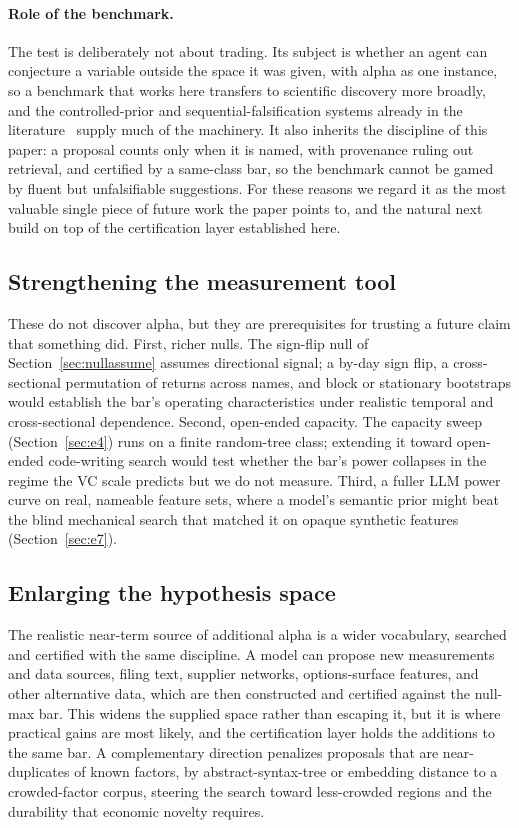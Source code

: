 \documentclass[11pt]{article}
\begin{document}
\paragraph{Role of the benchmark.} The test is deliberately not about trading. Its subject is
whether an agent can conjecture a variable outside the space it was given, with alpha as one instance, so
a benchmark that works here transfers to scientific discovery more broadly, and the controlled-prior and
sequential-falsification systems already in the literature~\cite{physgym,falsify} supply much of the
machinery. It also inherits the discipline of this paper: a proposal counts only when it is named, with
provenance ruling out retrieval, and certified by a same-class bar, so the benchmark cannot be gamed by
fluent but unfalsifiable suggestions. For these reasons we regard it as the most valuable single piece of
future work the paper points to, and the natural next build on top of the certification layer established
here.

\subsection{Strengthening the measurement tool}
\label{sec:future}

These do not discover alpha, but they are prerequisites for trusting a future claim that something
did. First, richer nulls. The sign-flip null of Section~\ref{sec:nullassume} assumes directional
signal; a by-day sign flip, a cross-sectional permutation of returns across names, and block or
stationary bootstraps would establish the bar's operating characteristics under realistic temporal and
cross-sectional dependence. Second, open-ended capacity. The capacity sweep (Section~\ref{sec:e4}) runs
on a finite random-tree class; extending it toward open-ended code-writing search would test whether
the bar's power collapses in the regime the VC scale predicts but we do not measure. Third, a fuller
LLM power curve on real, nameable feature sets, where a model's semantic prior might beat the blind
mechanical search that matched it on opaque synthetic features (Section~\ref{sec:e7}).

\subsection{Enlarging the hypothesis space}

The realistic near-term source of additional alpha is a wider vocabulary, searched and certified with
the same discipline. A model can propose new measurements and data sources, filing text, supplier
networks, options-surface features, and other alternative data, which are then constructed and
certified against the null-max bar. This widens the supplied space rather than escaping it, but it is
where practical gains are most likely, and the certification layer holds the additions to the same bar. A
complementary direction penalizes proposals that are near-duplicates of known factors, by
abstract-syntax-tree or embedding distance to a crowded-factor corpus, steering the search toward
less-crowded regions and the durability that economic novelty requires.
\end{document}
